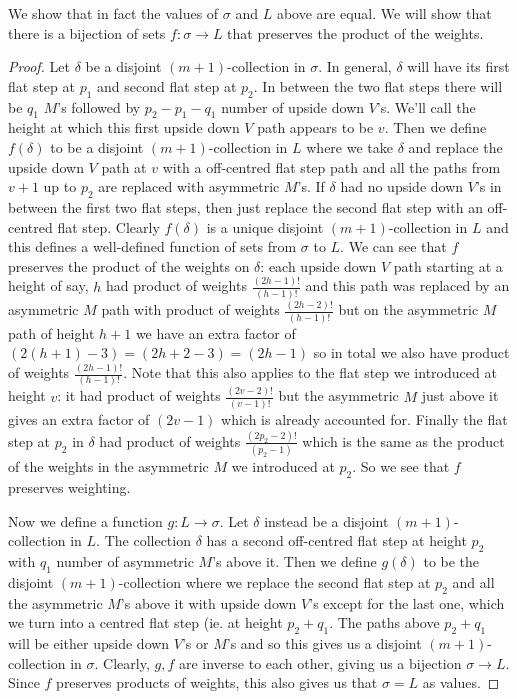 \documentclass[11pt]{article}
\theoremstyle{definition}
\theoremstyle{definition}
\theoremstyle{plain}
\theoremstyle{plain}
\theoremstyle{plain}
\theoremstyle{definition}
\begin{document}
We show that in fact the values of $\sigma$ and $L$ above are equal. We will show that there is a bijection of sets $f:\sigma \to L$ that preserves the product of the weights.

\begin{proof}
Let $\delta$ be a disjoint $(m+1)$-collection in $\sigma$. In general, $\delta$ will have its first flat step at $p_1$ and second flat step at $p_2$. In between the two flat steps there will be $q_1$ $M$'s followed by $p_2-p_1-q_1$ number of upside down $V$'s. We'll call the height at which this first upside down $V$ path appears to be $v$. Then we define $f(\delta)$ to be a disjoint $(m+1)$-collection in $L$ where we take $\delta$ and replace the upside down $V$ path at $v$ with a off-centred flat step path and all the paths from $v+1$ up to $p_2$ are replaced with asymmetric $M$'s. If $\delta$ had no upside down $V$'s in between the first two flat steps, then just replace the second flat step with an off-centred flat step. Clearly $f(\delta)$ is a unique disjoint $(m+1)$-collection in $L$ and this defines a well-defined function of sets from $\sigma$ to $L$. We can see that $f$ preserves the product of the weights on $\delta$: each upside down $V$ path starting at a height of say, $h$ had product of weights $\frac{(2h-1)!}{(h-1)!}$ and this path was replaced by an asymmetric $M$ path with product of weights $\frac{(2h-2)!}{(h-1)!}$ but on the asymmetric $M$ path of height $h+1$ we have an extra factor of $(2(h+1)-3) = (2h+2-3) = (2h-1)$ so in total we also have product of weights $\frac{(2h-1)!}{(h-1)!}$. Note that this also applies to the flat step we introduced at height $v$: it had product of weights $\frac{(2v-2)!}{(v-1)!}$ but the asymmetric $M$ just above it gives an extra factor of $(2v-1)$ which is already accounted for. Finally the flat step at $p_2$ in $\delta$ had product of weights $\frac{(2p_2-2)!}{(p_2-1)}$ which is the same as the product of the weights in the asymmetric $M$ we introduced at $p_2$. So we see that $f$ preserves weighting.

Now we define a function $g:L\to\sigma$. Let $\delta$ instead be a disjoint $(m+1)$-collection in $L$. The collection $\delta$ has a second off-centred flat step at height $p_2$ with $q_1$ number of asymmetric $M$'s above it. Then we define $g(\delta)$ to be the disjoint $(m+1)$-collection where we replace the second flat step at $p_2$ and all the asymmetric $M$'s above it with upside down $V$'s except for the last one, which we turn into a centred flat step (ie. at height $p_2+q_1$. The paths above $p_2+q_1$ will be either upside down $V$'s or $M$'s and so this gives us a disjoint $(m+1)$-collection in $\sigma$. Clearly, $g,f$ are inverse to each other, giving us a bijection $\sigma\to L$. Since $f$ preserves products of weights, this also gives us that $\sigma = L$ as values.
\end{proof}
\end{document}

